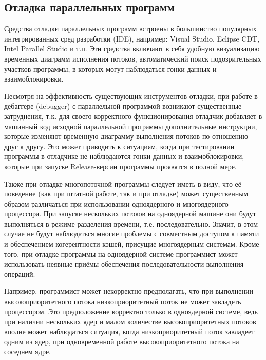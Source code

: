 \subsection{Отладка параллельных программ}

Средства отладки параллельных программ встроены в большинство популярных интегрированных сред разработки (IDE), например: Visual Studio, Eclipse CDT, Intel Parallel Studio и т.п. Эти средства включают в себя удобную визуализацию временных диаграмм исполнения потоков, автоматический поиск подозрительных участков программы, в которых могут наблюдаться гонки данных и взаимоблокировки.

Несмотря на эффективность существующих инструментов отладки, при работе в дебаггере (debugger) с параллельной программой возникают существенные затруднения, т.к. для своего корректного функционирования отладчик добавляет в машинный код исходной параллельной программы дополнительные инструкции, которые изменяют временную диаграмму выполнения потоков по отношению друг к другу. Это может приводить к ситуациям, когда при тестировании программы в отладчике не наблюдаются гонки данных и взаимоблокировки, которые при запуске Release-версии программы проявятся в полной мере.

Также при отладке многопоточной программы следует иметь в виду, что её поведение (как при штатной работе, так и при отладке) может существенным образом различаться при использовании одноядерного и многоядерного процессора. При запуске нескольких потоков на одноядерной машине они будут выполняться в режиме разделения времени, т.е. последовательно. Значит, в этом случае не будут наблюдаться многие проблемы с совместным доступом к памяти и обеспечением когерентности кэшей, присущие многоядерным системам. Кроме того, при отладке программы на одноядерной системе программист может использовать неявные приёмы обеспечения последовательности выполнения операций. 

Например, программист может некорректно предполагать, что при выполнении высокоприоритетного потока низкоприоритетный поток не может завладеть процессором. Это предположение корректно только в одноядерной системе, ведь при наличии нескольких ядер и малом количестве высокоприоритетных потоков вполне может наблюдаться ситуация, когда низкоприоритетный поток завладеет одним из ядер, при одновременной работе высокоприоритетного потока на соседнем ядре.
